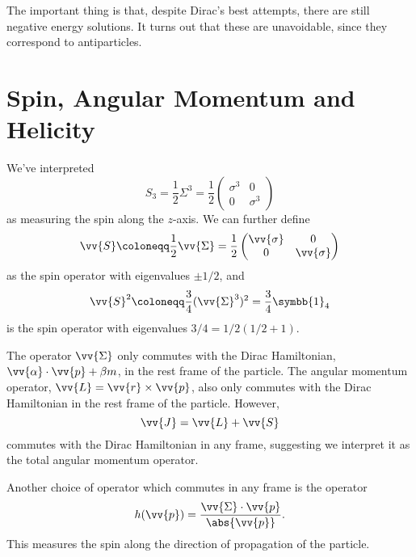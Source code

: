 \documentclass[fleqn]{NotesClass}
\newcommand{\ident}{\symbb{1}}
\begin{document}
    The important thing is that, despite Dirac's best attempts, there are still negative energy solutions.
    It turns out that these are unavoidable, since they correspond to antiparticles.
    
    \section{Spin, Angular Momentum and Helicity}
    We've interpreted
    \begin{equation}
        S_3 = \frac{1}{2}\Sigma^3 = \frac{1}{2}
        \begin{pmatrix}
            \sigma^3 & 0\\
            0 & \sigma^3
        \end{pmatrix}
    \end{equation}
    as measuring the spin along the \(z\)-axis.
    We can further define
    \begin{equation}
        \vv{S} \coloneqq \frac{1}{2}\vv{\Sigma} = \frac{1}{2}
        \begin{pmatrix}
            \vv{\sigma} & 0\\
            0 & \vv{\sigma}
        \end{pmatrix}
    \end{equation}
    as the spin operator with eigenvalues \(\pm 1/2\), and
    \begin{equation}
        \vv{S}^2 \coloneqq \frac{3}{4} (\vv{\Sigma}^3)^2 = \frac{3}{4}\ident_4
    \end{equation}
    is the spin operator with eigenvalues \(3/4 = 1/2(1/2 + 1)\).
    
    The operator \(\vv{\Sigma}\) only commutes with the Dirac Hamiltonian, \(\vv{\alpha} \cdot \vv{p} + \beta m\), in the rest frame of the particle.
    The angular momentum operator, \(\vv{L} = \vv{r} \times \vv{p}\), also only commutes with the Dirac Hamiltonian in the rest frame of the particle.
    However,
    \begin{equation}
        \vv{J} = \vv{L} + \vv{S}
    \end{equation}
    commutes with the Dirac Hamiltonian in any frame, suggesting we interpret it as the total angular momentum operator.
    
    Another choice of operator which commutes in any frame is the  operator
    \begin{equation}
        h(\vv{p}) = \frac{\vv{\Sigma} \cdot \vv{p}}{\abs{\vv{p}}}.
    \end{equation}
    This measures the spin along the direction of propagation of the particle.
    
\end{document}
